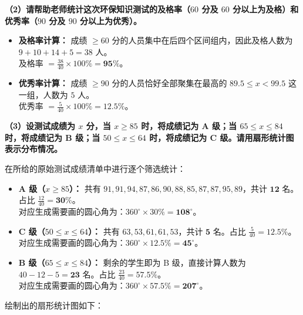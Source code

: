 \documentclass[12pt, a4paper]{ctexrep}
\begin{document}
\vspace{0.6cm}

\textbf{（2）请帮助老师统计这次环保知识测试的及格率（$60$ 分及 $60$ 分以上为及格）和优秀率（$90$ 分及 $90$ 分以上为优秀）。}

\vspace{0.2cm}
\begin{itemize}
  \item \textbf{及格率计算：} 成绩 $\geqslant 60$ 分的人员集中在后四个区间组内，因此及格人数为 $9 + 10 + 14 + 5 = 38$ 人。\\
  及格率 $= \frac{38}{40} \times 100\% = \boldsymbol{95\%}$。
  \item \textbf{优秀率计算：} 成绩 $\geqslant 90$ 分的人员恰好全部聚集在最高的 $89.5 \leqslant x < 99.5$ 这一组，人数为 $5$ 人。\\
  优秀率 $= \frac{5}{40} \times 100\% = \boldsymbol{12.5\%}$。
\end{itemize}

\vspace{0.6cm}

\textbf{（3）设测试成绩为 $x$ 分，当 $x \geqslant 85$ 时，将成绩记为 A 级；当 $65 \leqslant x \leqslant 84$ 时，将成绩记为 B 级；当 $50 \leqslant x \leqslant 64$ 时，将成绩记为 C 级。请用扇形统计图表示分布情况。}

\vspace{0.2cm}
在所给的原始测试成绩清单中进行逐个筛选统计：
\begin{itemize}
  \item \textbf{A 级（$x \geqslant 85$）：} 共有 $91, 91, 94, 87, 86, 90, 88, 85, 87, 87, 95, 89$，共计 $\boldsymbol{12}$ 名。占比 $\frac{12}{40} = \boldsymbol{30\%}$。\\
  对应生成需要画的圆心角为：$360^\circ \times 30\% = \boldsymbol{108^\circ}$。
  \item \textbf{C 级（$50 \leqslant x \leqslant 64$）：} 共有 $63, 53, 61, 61, 53$，共计 $\boldsymbol{5}$ 名。占比 $\frac{5}{40} = \boldsymbol{12.5\%}$。\\
  对应生成需要画的圆心角为：$360^\circ \times 12.5\% = \boldsymbol{45^\circ}$。
  \item \textbf{B 级（$65 \leqslant x \leqslant 84$）：} 剩余的学生即为 B 级，直接计算人数为 $40 - 12 - 5 = \boldsymbol{23}$ 名。占比 $\frac{23}{40} = \boldsymbol{57.5\%}$。\\
  对应生成需要画的圆心角为：$360^\circ \times 57.5\% = \boldsymbol{207^\circ}$。
\end{itemize}

绘制出的扇形统计图如下：
\end{document}
